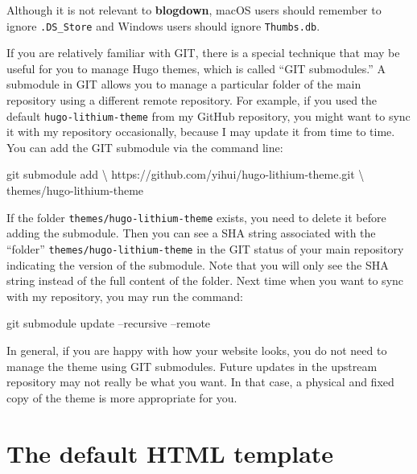 \documentclass[12pt,]{krantz}
\makeatletter
\newenvironment{Shaded}{\begin{snugshade}}{\end{snugshade}}
\newcommand{\FunctionTok}[1]{\textcolor[rgb]{0.00,0.00,0.00}{#1}}
\newcommand{\NormalTok}[1]{#1}
\newenvironment{kframe}{%
\medskip{}
\setlength{\fboxsep}{.8em}
 \def\at@end@of@kframe{}%
 \ifinner\ifhmode%
  \def\at@end@of@kframe{\end{minipage}}%
  \begin{minipage}{\columnwidth}%
 \fi\fi%
 \def\FrameCommand##1{\hskip\@totalleftmargin \hskip-\fboxsep
 \colorbox{shadecolor}{##1}\hskip-\fboxsep
     \hskip-\linewidth \hskip-\@totalleftmargin \hskip\columnwidth}%
 \MakeFramed {\advance\hsize-\width
   \@totalleftmargin\z@ \linewidth\hsize
   \@setminipage}}%
 {\par\unskip\endMakeFramed%
 \at@end@of@kframe}
\renewenvironment{Shaded}{\begin{kframe}}{\end{kframe}}
\theoremstyle{definition}
\theoremstyle{definition}
\theoremstyle{definition}
\theoremstyle{remark}
\makeatother
\begin{document}
Although it is not relevant to \textbf{blogdown}, macOS users should
remember to ignore \texttt{.DS\_Store} and Windows users should ignore
\texttt{Thumbs.db}.

If you are relatively familiar with GIT, there is
a special technique that may be useful for you to manage Hugo themes,
which is called ``GIT submodules.'' A submodule in GIT allows you to
manage a particular folder of the main repository using a different
remote repository. For example, if you used the default
\texttt{hugo-lithium-theme} from my GitHub repository, you might want to
sync it with my repository occasionally, because I may update it from
time to time. You can add the GIT submodule via the command line:

\begin{Shaded}
\begin{Highlighting}[]
\FunctionTok{git}\NormalTok{ submodule add \textbackslash{}}
\NormalTok{  https://github.com/yihui/hugo-lithium-theme.git \textbackslash{}}
\NormalTok{  themes/hugo-lithium-theme}
\end{Highlighting}
\end{Shaded}

If the folder \texttt{themes/hugo-lithium-theme} exists, you need to
delete it before adding the submodule. Then you can see a SHA string
associated with the ``folder'' \texttt{themes/hugo-lithium-theme} in the
GIT status of your main repository indicating the version of the
submodule. Note that you will only see the SHA string instead of the
full content of the folder. Next time when you want to sync with my
repository, you may run the command:

\begin{Shaded}
\begin{Highlighting}[]
\FunctionTok{git}\NormalTok{ submodule update --recursive --remote}
\end{Highlighting}
\end{Shaded}

In general, if you are happy with how your website looks, you do not
need to manage the theme using GIT submodules. Future updates in the
upstream repository may not really be what you want. In that case, a
physical and fixed copy of the theme is more appropriate for you.

\hypertarget{default-template}{%
\section{The default HTML template}\label{default-template}}
\end{document}
